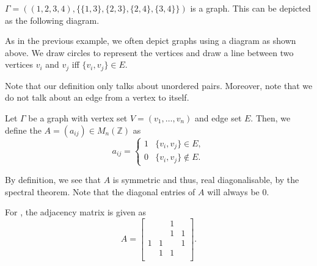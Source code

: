 \documentclass[12pt]{article}	%
\begin{document}
\begin{ex}
    $\Gamma = ((1, 2, 3, 4), \{\{1, 3\}, \{2, 3\}, \{2, 4\}, \{3, 4\}\})$ is a graph. This can be depicted as the following diagram.
    

    \begin{center}
        \captionsetup{type=figure}
         \label{fig:graph1}
    \end{center}
\end{ex}

\begin{rem}
    As in the previous example, we often depict graphs using a diagram as shown above. We draw circles to represent the vertices and draw a line between two vertices $v_i$ and $v_j$ iff $\{v_i, v_j\} \in E.$

    Note that our definition only talks about unordered pairs. Moreover, note that we do not talk about an edge from a vertex to itself.
\end{rem}

\begin{defn}%
    Let $\Gamma$ be a graph with vertex set $V = (v_1, \ldots, v_n)$ and edge set $E.$ Then, we define the  $A = (a_{ij}) \in M_n(\mathbb{Z})$ as
    \begin{equation*} 
        a_{ij} = \begin{cases}
            1 & \{v_i, v_j\} \in E,\\
            0 & \{v_i, v_j\} \notin E. 
        \end{cases}
    \end{equation*}
\end{defn}

\begin{rem}
    By definition, we see that $A$ is symmetric and thus, real diagonalisable, by the spectral theorem. Note that the diagonal entries of $A$ will always be $0.$
\end{rem}

\begin{ex}
    For , the adjacency matrix is given as
    \begin{equation*} 
        A = \begin{bmatrix}
             &   & 1 &   \\
             &   & 1 & 1 \\
           1 & 1 &   & 1 \\
             & 1 & 1 &   \\
        \end{bmatrix}.
    \end{equation*}
\end{ex}
\end{document}
